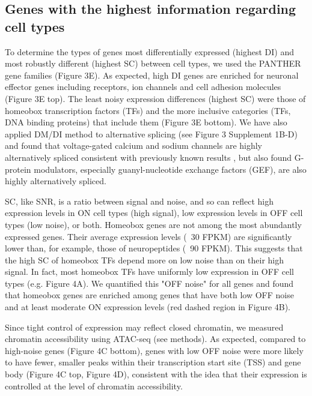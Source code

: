 \subsection{Genes with the highest information regarding cell types}

To determine the types of genes most differentially expressed (highest DI) and most robustly different (highest SC) between cell types, we used the PANTHER \citep{Thomas_2003} gene families (Figure 3E). As expected, high DI genes are enriched for neuronal effector genes including receptors, ion channels and cell adhesion molecules (Figure 3E top). The least noisy expression differences (highest SC) were those of homeobox transcription factors (TFs) and the more inclusive categories (TFs, DNA binding proteins) that include them (Figure 3E bottom). We have also applied DM/DI method to alternative splicing (see Figure 3 Supplement 1B-D) and found that voltage-gated calcium and sodium channels are highly alternatively spliced consistent with previously known results \citep[e.g.][]{Lipscombe_2013}, but also found G-protein modulators, especially guanyl-nucleotide exchange factors (GEF), are also highly alternatively spliced. 

SC, like SNR, is a ratio between signal and noise, and so can reflect high expression levels in ON cell types (high signal), low expression levels in OFF cell types (low noise), or both. Homeobox genes are not among the most abundantly expressed genes. Their average expression levels (~30 FPKM) are significantly lower than, for example, those of neuropeptides (~90 FPKM). This suggests that the high SC of homeobox TFs depend more on low noise than on their high signal. In fact, most homeobox TFs have uniformly low expression in OFF cell types (e.g. Figure 4A). We quantified this "OFF noise" for all genes and found that homeobox genes are enriched among genes that have both low OFF noise and at least moderate ON expression levels (red dashed region in Figure 4B).

Since tight control of expression may reflect closed chromatin, we measured chromatin accessibility using ATAC-seq (see methods). As expected, compared to high-noise genes (Figure 4C bottom), genes with low OFF noise were more likely to have fewer, smaller peaks within their transcription start site (TSS) and gene body (Figure 4C top, Figure 4D), consistent with the idea that their expression is controlled at the level of chromatin accessibility.

